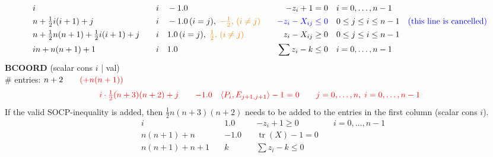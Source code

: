 \documentclass[11pt,a4paper]{article}
\DeclareMathOperator{\tr}{tr}
\theoremstyle{definition}
\begin{document}
{\[\begin{aligned}
    &i \quad & i \quad & -1.0 \quad & -z_i + 1 = 0 \quad & i = 0,\dots,n-1
    \\
    &n+\tfrac{1}{2}i(i+1)+j \quad & i \quad & -1.0\, (i =
    j),\; {\color{orange} -\tfrac{1}{2},\,(i \neq j)} \quad & {\color{blue}-z_i - X_{ij}
    \leq 0} \quad & 0 \leq j \leq i \leq n-1 \quad {\color{blue}
    (\text{this line is cancelled})} \\
    &n+\tfrac{1}{2}n(n+1)+\tfrac{1}{2}i(i+1)+j \quad & i \quad & 1.0\, (i =
    j),\; {\color{orange} \tfrac{1}{2},\,(i \neq j)}\quad & z_i - X_{ij}
    \geq 0 \quad & 0 \leq j \leq i \leq n-1 \\
    &in+n(n+1)+1 \quad & i \quad & 1.0 \quad & \sum z_i - k \leq 0 \quad &
    i = 0,\dots,n-1 \\
  \end{aligned}
\]
\textbf{BCOORD} (scalar cons $i$ | val) \\
\# entries: $n+2 \qquad {\color{red} (+n(n+1))}$ \\
\[
\begin{aligned}
  &{\color{red}i\cdot\tfrac{1}{2}(n+3)(n+2) + j} \quad & {\color{red}-1.0}
  \quad & {\color{red} \langle P_i, E_{j+1,j+1} \rangle - 1 = 0} \quad & {\color{red} j
  = 0,\dots,n,\; i = 0,\dots,n-1} \\
  \end{aligned}
\]
{\color{red} If the valid SOCP-inequality is added, then $\tfrac{1}{2}n(n+3)(n+2)$ needs
  to be added to the entries in the first column (scalar cons $i$).}
\[
  \begin{aligned}
    &i \quad & 1.0 \quad & -z_i + 1 \geq 0 \quad & i = 0,\dots,n-1 \\
    &n(n+1)+n \quad & -1.0 \quad & \tr(X) -1 = 0 \quad & \\
    &n(n+1)+n+1 \quad & k \quad & \sum z_i - k \leq 0 \quad & \\
  \end{aligned}
\]
}
\end{document}
